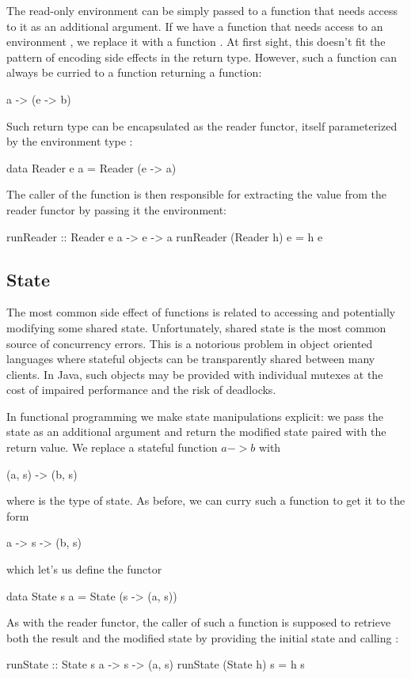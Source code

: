 \documentclass[DaoFP]{subfiles}
\begin{document}
The read-only environment can be simply passed to a function that needs access to it as an additional argument. If we have a function  that needs access to an environment , we replace it with a function . At first sight, this doesn't fit the pattern of encoding side effects in the return type. However, such a function can always be curried to a function returning a function:
\begin{haskell}
a -> (e -> b)
\end{haskell}
Such return type can be encapsulated as the reader functor, itself parameterized by the environment type :
\begin{haskell}
data Reader e a = Reader (e -> a)
\end{haskell}
The caller of the function is then responsible for extracting the value from the reader functor by passing it the environment:
\begin{haskell}
runReader :: Reader e a -> e -> a
runReader (Reader h) e = h e
\end{haskell}

\subsection{State}

The most common side effect of functions is related to accessing and potentially modifying some shared state. Unfortunately, shared state is the most common source of concurrency errors. This is a notorious problem in object oriented languages where stateful objects can be transparently shared between many clients. In Java, such objects may be provided with individual mutexes at the cost of impaired performance and the risk of deadlocks.

In functional programming we make state manipulations explicit: we pass the state as an additional argument and return the modified state paired with the return value. We replace a stateful function $a->b$ with
\begin{haskell}
(a, s) -> (b, s)
\end{haskell}
where  is the type of state. As before, we can curry such a function to get it to the form
\begin{haskell}
a -> s -> (b, s)
\end{haskell}
which let's us define the functor
\begin{haskell}
data State s a = State (s -> (a, s))
\end{haskell}
As with the reader functor, the caller of such a function is supposed to retrieve both the result and the modified state by providing the initial state and calling :
\begin{haskell}
runState :: State s a -> s -> (a, s)
runState (State h) s = h s
\end{haskell}
\end{document}
